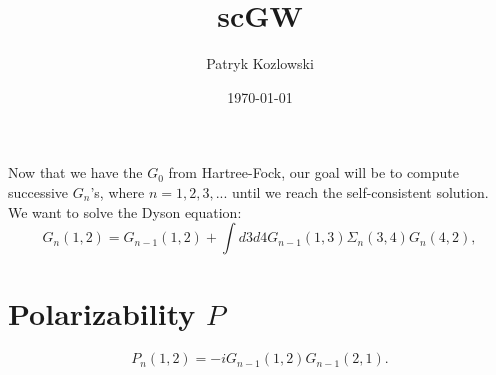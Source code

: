 \documentclass[12pt]{article}
\title{scGW}
\author{Patryk Kozlowski}
\date{\today}
\begin{document}
\maketitle
Now that we have the  $G_0$ from Hartree-Fock, our goal will be to compute successive $G_n$'s, where $n=1,2,3,...$ until we reach the self-consistent solution. We want to solve the Dyson equation:
\begin{equation}
    G_n(1,2)=G_{n-1}(1,2)+\int d3d4 G_{n-1}(1,3) \Sigma_n(3,4) G_n(4,2),
\end{equation}
\section{Polarizability $P$}
\begin{equation}
    P_n(1,2)=-iG_{n-1}(1,2)G_{n-1}(2,1).
\end{equation}
\end{document}
